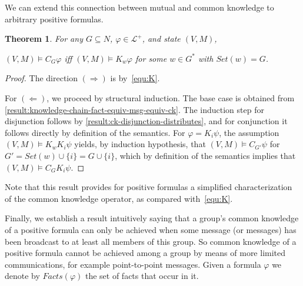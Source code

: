 \documentclass{article}
\newcounter{#1}
\newtheorem{theorem}{Theorem}[section]
\newcommand{\state}[1][]{\ensuremath{(V#1,M#1)}\xspace}
\newcommand{\setof}[1]{\ensuremath{\mathit{Set}(#1)}\xspace}
\newcommand{\knows}[1]{\ensuremath{K_{#1}}\xspace}
\newcommand{\ck}[1]{\ensuremath{C_{#1}}\xspace}\newcommand{\Facts}{\mathit{Facts}}
\begin{document}
We can extend this connection between mutual and common knowledge to arbitrary positive formulas.

\begin{theorem}
  \label{result:knowledge-chain-phi-equiv-ck}
  \label{thm:permutation}
  For any $G\subseteq N$, $\varphi\in\mathcal{L}^+$, and state \state,
  \begin{center}
    $\state\vDash \ck G\varphi$ iff $\state\vDash \knows w\varphi$ for some $w\in G^*$ with $\setof w=G$.
  \end{center}
\end{theorem}
\begin{proof}
  The direction $(\Rightarrow)$ is by~\eqref{equ:K}.

  For $(\Leftarrow)$, we proceed by structural induction.
  The base case
is obtained from \cref{result:knowledge-chain-fact-equiv-msg-equiv-ck}.
  The induction step for disjunction follows by
  \cref{result:ck-disjunction-distributes},
  and for conjunction it follows directly by definition of the semantics.
  For $\varphi=\knows i\psi$,
  the assumption $\state\vDash \knows w\knows i\psi$ yields, by induction hypothesis,
  that $\state\vDash \ck{G'}\psi$ for $G'=\setof w\cup\{i\}=G\cup\{i\}$,
  which by definition of the semantics implies that $\state\vDash \ck G\knows i\psi$.
\end{proof}
Note that this result provides for positive formulas
a simplified characterization of the common knowledge operator,
as compared with~\eqref{equ:K}.

Finally, we establish a result intuitively saying that a group's
common knowledge of a positive formula can only be achieved
when some message (or messages) has been broadcast to at least all
members of this group.  So common knowledge of a positive formula cannot be
achieved among a group by means of more limited communications, for example
point-to-point messages.
Given a formula $\varphi$ we denote by $Facts(\varphi)$ the set of facts that occur in it.
\end{document}
